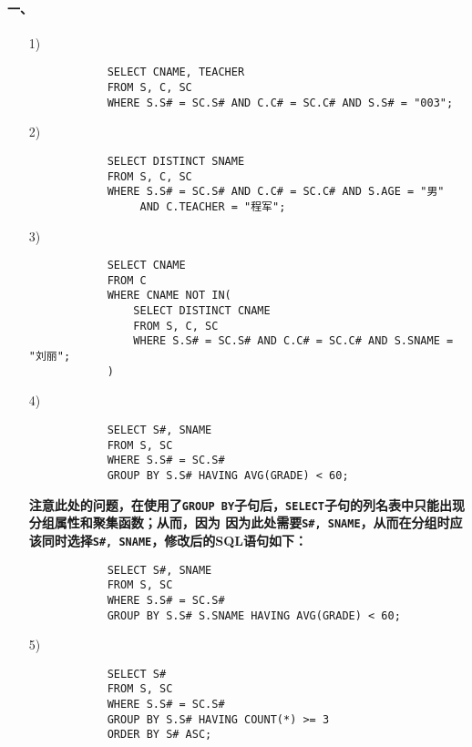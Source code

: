 \documentclass[10pt,a4paper]{article}
\begin{document}
	\pagestyle{main}    %
	
	\setlength{\parskip}{0pt}
	\renewcommand{\baselinestretch}{1.5}
	
    \paragraph{一、}
    \begin{enumerate}
        \item[1)] 
        \begin{verbatim}
            SELECT CNAME, TEACHER
            FROM S, C, SC
            WHERE S.S# = SC.S# AND C.C# = SC.C# AND S.S# = "003";
        \end{verbatim}
        \item[2)]\begin{verbatim}
            SELECT DISTINCT SNAME
            FROM S, C, SC
            WHERE S.S# = SC.S# AND C.C# = SC.C# AND S.AGE = "男"
                 AND C.TEACHER = "程军";
        \end{verbatim}
        \item[3)]\begin{verbatim}
            SELECT CNAME
            FROM C
            WHERE CNAME NOT IN(
                SELECT DISTINCT CNAME
                FROM S, C, SC
                WHERE S.S# = SC.S# AND C.C# = SC.C# AND S.SNAME = "刘丽";
            )
        \end{verbatim}
        \item[4)]\begin{verbatim}
            SELECT S#, SNAME
            FROM S, SC
            WHERE S.S# = SC.S#
            GROUP BY S.S# HAVING AVG(GRADE) < 60;
        \end{verbatim}
        \textbf{注意此处的问题，在使用了\texttt{GROUP BY}子句后，\texttt{SELECT}子句的列名表中只能出现分组属性和聚集函数；从而，因为
        因为此处需要\texttt{S\#, SNAME}，从而在分组时应该同时选择\texttt{S\#, SNAME}，修改后的SQL语句如下：}
        \begin{verbatim}
            SELECT S#, SNAME
            FROM S, SC
            WHERE S.S# = SC.S#
            GROUP BY S.S# S.SNAME HAVING AVG(GRADE) < 60;
        \end{verbatim}
        \item[5)]\begin{verbatim}
            SELECT S#
            FROM S, SC
            WHERE S.S# = SC.S#
            GROUP BY S.S# HAVING COUNT(*) >= 3
            ORDER BY S# ASC;
        \end{verbatim}
    \end{enumerate}
    
\end{document}

